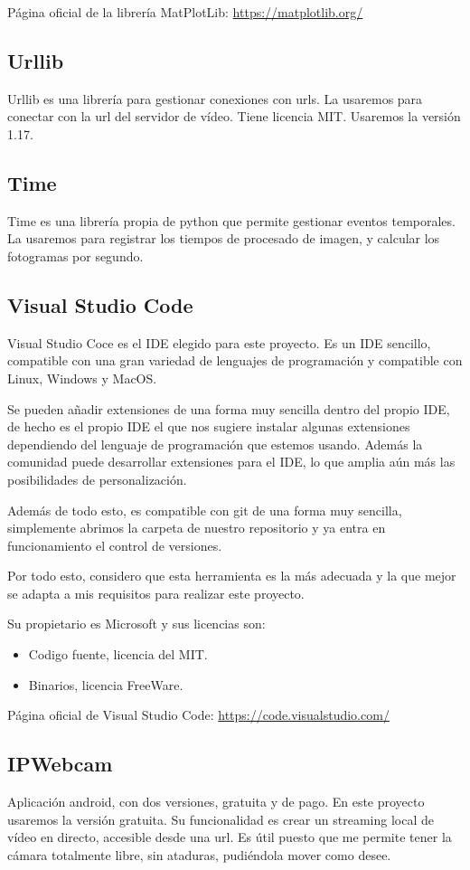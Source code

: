 Página oficial de la librería MatPlotLib: \url{https://matplotlib.org/}

\subsection{Urllib}
Urllib es una librería para gestionar conexiones con urls. La usaremos para conectar con la url del servidor de vídeo. 
Tiene licencia MIT.
Usaremos la versión 1.17.

\subsection{Time}
Time es una librería propia de python que permite gestionar eventos temporales. La usaremos para registrar los tiempos de procesado de imagen, y calcular los fotogramas por segundo. 


\subsection{Visual Studio Code}
Visual Studio Coce es el IDE elegido para este proyecto. Es un IDE sencillo, compatible con una gran variedad de lenguajes de programación y compatible con Linux, Windows y MacOS.
 
Se pueden añadir extensiones de una forma muy sencilla dentro del propio IDE, de hecho es el propio IDE el que nos sugiere instalar algunas extensiones dependiendo del lenguaje de programación que estemos usando. Además la comunidad puede desarrollar extensiones para el IDE, lo que amplia aún más las posibilidades de personalización.

Además de todo esto, es compatible con git de una forma muy sencilla, simplemente abrimos la carpeta de nuestro repositorio y ya entra en funcionamiento el control de versiones.

Por todo esto, considero que esta herramienta es la más adecuada y la que mejor se adapta a mis requisitos para realizar este proyecto.

Su propietario es Microsoft y sus licencias son:
\begin{itemize}
	\item Codigo fuente, licencia del MIT.
	\item Binarios, licencia FreeWare.
\end{itemize}

Página oficial de Visual Studio Code: \url{https://code.visualstudio.com/}

\subsection{IPWebcam}
Aplicación android, con dos versiones, gratuita y de pago. En este proyecto usaremos la versión gratuita.
Su funcionalidad es crear un streaming local de vídeo en directo, accesible desde una url. Es útil puesto que me permite tener la cámara totalmente libre, sin ataduras, pudiéndola mover como desee.

